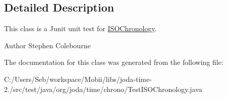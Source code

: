 \subsection{Detailed Description}
This class is a Junit unit test for \hyperlink{classorg_1_1joda_1_1time_1_1chrono_1_1_i_s_o_chronology}{I\-S\-O\-Chronology}.

\begin{DoxyAuthor}{Author}
Stephen Colebourne 
\end{DoxyAuthor}


The documentation for this class was generated from the following file\-:\begin{DoxyCompactItemize}
\item 
C\-:/\-Users/\-Seb/workspace/\-Mobii/libs/joda-\/time-\/2./src/test/java/org/joda/time/chrono/Test\-I\-S\-O\-Chronology.\-java\end{DoxyCompactItemize}
